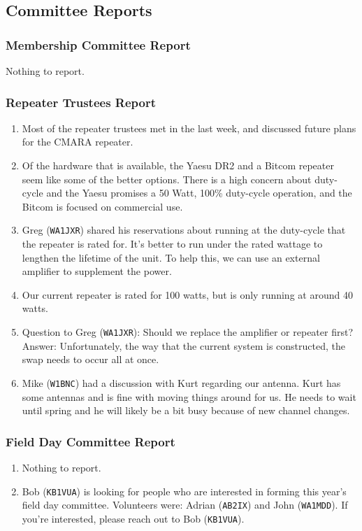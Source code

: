 \documentclass[10pt,letterpaper]{article}
\begin{document}
\subsection{Committee Reports}

\subsubsection{Membership Committee Report}
Nothing to report.

\subsubsection{Repeater Trustees Report}
\begin{enumerate}
  \item Most of the repeater trustees met in the last week, and discussed future plans for the CMARA repeater.
  \item Of the hardware that is available, the Yaesu DR2 and a Bitcom repeater seem like some of the better options. There is a high concern about duty-cycle and the Yaesu promises a 50 Watt, 100\% duty-cycle operation, and the Bitcom is focused on commercial use.
  \item Greg (\texttt{WA1JXR}) shared his reservations about running at the duty-cycle that the repeater is rated for. It's better to run under the rated wattage to lengthen the lifetime of the unit. To help this, we can use an external amplifier to supplement the power.
  \item Our current repeater is rated for 100 watts, but is only running at around 40 watts.
  \item Question to Greg (\texttt{WA1JXR}): Should we replace the amplifier or repeater first? Answer: Unfortunately, the way that the current system is constructed, the swap needs to occur all at once.
  \item Mike (\texttt{W1BNC}) had a discussion with Kurt regarding our antenna. Kurt has some antennas and is fine with moving things around for us. He needs to wait until spring and he will likely be a bit busy because of new channel changes.
\end{enumerate}

\subsubsection{Field Day Committee Report}
\begin{enumerate}
  \item Nothing to report.
  \item Bob (\texttt{KB1VUA}) is looking for people who are interested in forming this year's field day committee. Volunteers were: Adrian (\texttt{AB2IX}) and John (\texttt{WA1MDD}). If you're interested, please reach out to Bob (\texttt{KB1VUA}).
\end{enumerate}
\end{document}
